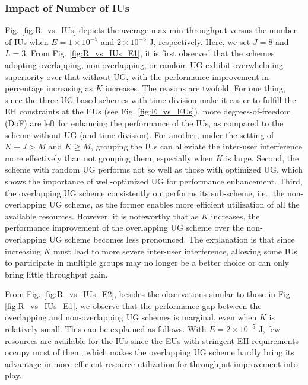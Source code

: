 \documentclass[12pt,draftclsnofoot, onecolumn]{IEEEtran}
\theoremstyle{plain}
\begin{document}
\begin{sloppypar}
\subsubsection{Impact of Number of IUs}
Fig. \ref{fig:R_vs_IUs} depicts the average max-min throughput versus the number of IUs when $E = 1 \times 10^{-5}$ and $2 \times 10^{-5}$ J, respectively. Here, we set $J = 8$ and $L = 3$. From Fig. \ref{fig:R_vs_IUs_E1}, it is first observed that the schemes adopting overlapping, non-overlapping, or random UG exhibit overwhelming superiority over that without UG, with the performance improvement in percentage increasing as $K$ increases. The reasons are twofold. For one thing, since the three UG-based schemes with time division make it easier to fulfill the EH constraints at the EUs (see Fig. \ref{fig:E_vs_EUs}), more degrees-of-freedom (DoF) are left for enhancing the performance of the IUs, as compared to the scheme without UG (and time division). For another, under the setting of $K + J > M$ and $K \geq M$, grouping the IUs can alleviate the inter-user interference more effectively than not grouping them, especially when $K$ is large. Second, the scheme with random UG performs not so well as those with optimized UG, which shows the importance of well-optimized UG for performance enhancement. Third, the overlapping UG scheme consistently outperforms its sub-scheme, i.e., the non-overlapping UG scheme, as the former enables more efficient utilization of all the available resources. However, it is noteworthy that as $K$ increases, the performance improvement of the overlapping UG scheme over the non-overlapping UG scheme becomes less pronounced. The explanation is that since increasing $K$ must lead to more severe inter-user interference, allowing some IUs to participate in multiple groups may no longer be a better choice or can only bring little throughput gain. 

From Fig. \ref{fig:R_vs_IUs_E2}, besides the
observations similar to those in Fig. \ref{fig:R_vs_IUs_E1}, we observe that the performance gap between the overlapping and non-overlapping UG schemes is marginal, even when $K$ is relatively small. This can be explained as follows. With $E = 2 \times 10^{-5}$ J, few resources are available for the IUs since the EUs with stringent EH requirements occupy most of them, which makes the overlapping UG scheme hardly bring its advantage in more efficient resource utilization for throughput improvement into play. 


\end{sloppypar}
\end{document}
